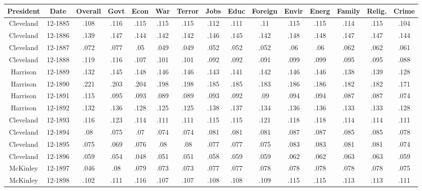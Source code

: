 \begin{sidewaystable}
\begin{singlespace}
\begin{center}
 \begin{tabular}{||c c c c c c c c c c c c c c c||}
 \hline
 President & Date & Overall & Govt & Econ & War & Terror & Jobs & Educ & Foreign & Envir & Energ & Family & Relig. & Crime \\
 \hline\hline
Cleveland & 12-1885 & .108 & .116 & .115 & .115 & .115 & .112 & .111 & .11 & .115 & .115 & .114 & .115 & .104 \\ 
\hline
Cleveland & 12-1886 & .139 & .147 & .144 & .142 & .142 & .146 & .145 & .142 & .148 & .148 & .147 & .147 & .144 \\ 
\hline
Cleveland & 12-1887 & .072 & .077 & .05 & .049 & .049 & .052 & .052 & .052 & .06 & .06 & .062 & .062 & .061 \\ 
\hline
Cleveland & 12-1888 & .119 & .116 & .107 & .101 & .101 & .092 & .092 & .091 & .099 & .099 & .095 & .095 & .088 \\ 
\hline
Harrison & 12-1889 & .132 & .145 & .148 & .146 & .146 & .143 & .141 & .142 & .146 & .146 & .138 & .139 & .128 \\ 
\hline
Harrison & 12-1890 & .221 & .203 & .204 & .198 & .198 & .185 & .185 & .183 & .186 & .186 & .182 & .182 & .171 \\ 
\hline
Harrison & 12-1891 & .115 & .095 & .093 & .089 & .089 & .093 & .092 & .09 & .094 & .094 & .087 & .087 & .074 \\ 
\hline
Harrison & 12-1892 & .132 & .136 & .128 & .125 & .125 & .138 & .137 & .134 & .136 & .136 & .133 & .133 & .128 \\ 
\hline
Cleveland & 12-1893 & .116 & .123 & .114 & .111 & .111 & .115 & .115 & .121 & .118 & .118 & .114 & .114 & .111 \\ 
\hline
Cleveland & 12-1894 & .08 & .075 & .07 & .074 & .074 & .081 & .081 & .081 & .087 & .087 & .085 & .085 & .078 \\ 
\hline
Cleveland & 12-1895 & .075 & .069 & .076 & .08 & .08 & .077 & .077 & .075 & .083 & .083 & .081 & .081 & .074 \\ 
\hline
Cleveland & 12-1896 & .059 & .054 & .048 & .051 & .051 & .058 & .059 & .059 & .062 & .062 & .063 & .063 & .059 \\ 
\hline
McKinley & 12-1897 & .046 & .08 & .079 & .073 & .073 & .077 & .077 & .078 & .078 & .078 & .078 & .078 & .075 \\ 
\hline
McKinley & 12-1898 & .102 & .111 & .116 & .107 & .107 & .108 & .108 & .109 & .115 & .115 & .113 & .113 & .111 \\ 

\end{tabular}
\end{center}
\end{singlespace}
\end{sidewaystable}
